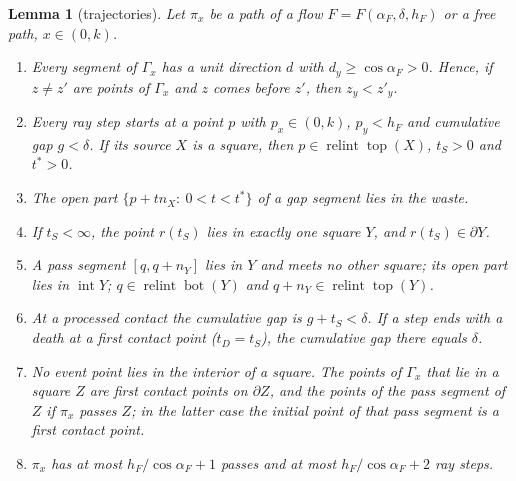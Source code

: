 \documentclass[11pt]{amsart}
\newcommand{\relint}{\operatorname{relint}}
\newcommand{\Bot}{\operatorname{bot}}
\newcommand{\Top}{\operatorname{top}}
\newtheorem{lemma}[theorem]{Lemma}
\theoremstyle{definition}
\theoremstyle{remark}
\numberwithin{equation}{section}
\begin{document}
\begin{lemma}[trajectories]\label{lem:flows-traj}
Let $\pi_x$ be a path of a flow $F=F(\alpha_F,\delta,h_F)$ or a free path, $x\in(0,k)$.
\begin{enumerate}[label=(\alph*)]
\item Every segment of $\Gamma_x$ has a unit direction $d$ with $d_y\ge\cos\alpha_F>0$. Hence, if $z\ne z'$ are points
of $\Gamma_x$ and $z$ comes before $z'$, then $z_y<z'_y$.
\item Every ray step starts at a point $p$ with $p_x\in(0,k)$, $p_y<h_F$ and cumulative gap $g<\delta$. If its source
$X$ is a square, then $p\in\relint\Top(X)$, $t_S>0$ and $t^*>0$.
\item The open part $\{p+tn_X:\ 0<t<t^*\}$ of a gap segment lies in the waste.
\item If $t_S<\infty$, the point $r(t_S)$ lies in exactly one square $Y$, and $r(t_S)\in\partial Y$.
\item A pass segment $[q,q+n_Y]$ lies in $Y$ and meets no other square; its open part lies in $\operatorname{int}Y$;
$q\in\relint\Bot(Y)$ and $q+n_Y\in\relint\Top(Y)$.
\item At a processed contact the cumulative gap is $g+t_S<\delta$. If a step ends with a death at a first contact
point ($t_D=t_S$), the cumulative gap there equals $\delta$.
\item No event point lies in the interior of a square. The points of $\Gamma_x$ that lie in a square $Z$ are first
contact points on $\partial Z$, and the points of the pass segment of $Z$ if $\pi_x$ passes $Z$; in the latter case the
initial point of that pass segment is a first contact point.
\item $\pi_x$ has at most $h_F/\cos\alpha_F+1$ passes and at most $h_F/\cos\alpha_F+2$ ray steps.
\end{enumerate}
\end{lemma}
\end{document}
